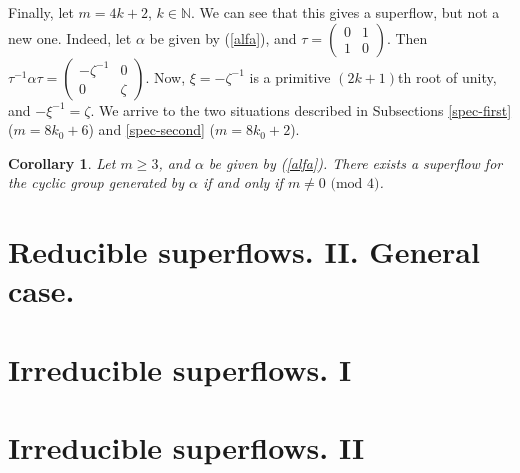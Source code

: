 \documentclass[reqno,12pt]{amsart}
\newtheorem{cor}{Corollary}
\begin{document}
Finally, let $m=4k+2$, $k\in\mathbb{N}$. We can see that this gives a superflow, but not a new one. Indeed, let $\alpha$ be given by (\ref{alfa}), and $\tau=\begin{pmatrix} 0 & 1\\1 & 0\end{pmatrix}$. Then $\tau^{-1}\alpha\tau=\begin{pmatrix}
-\zeta^{-1} & 0\\
0 & \zeta
\end{pmatrix}$. Now, $\xi=-\zeta^{-1}$ is a primitive $(2k+1)$th root of unity, and $-\xi^{-1}=\zeta$. We arrive to the two situations described in Subsections \ref{spec-first} ($m=8k_{0}+6$) and \ref{spec-second} ($m=8k_{0}+2$).
\begin{cor}Let $m\geq 3$, and $\alpha$ be given by (\ref{alfa}). There exists a superflow for the cyclic group generated by $\alpha$ if and only if $m\neq 0 \text{ (mod }4)$.
\end{cor}  
\section{Reducible superflows. II. General case.}
\section{Irreducible superflows. I}
\section{Irreducible superflows. II}    
\end{document}
